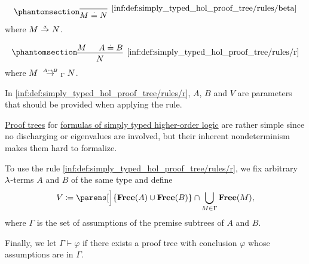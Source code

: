 \begin{definition}
\begin{thmenum}[series=def:simply_typed_hol_proof_tree]
\begin{paracol}{3}
      \begin{nthcolumn}{1}
        \ParacolAlignmentHack
        \begin{equation*}\taglabel[\ensuremath{ \logic{A}_4 }]{inf:def:simply_typed_hol_proof_tree/rules/beta}
          \begin{prooftree}
            \infer0[\ref{inf:def:simply_typed_hol_proof_tree/rules/beta}]{ M \syneq N },
          \end{prooftree}
        \end{equation*}
        where \( M \bred N \).
      \end{nthcolumn}

      \begin{nthcolumn}{2}
        \ParacolAlignmentHack
        \begin{equation*}\taglabel[\ensuremath{ \logic{R} }]{inf:def:simply_typed_hol_proof_tree/rules/r}
          \begin{prooftree}
            \hypo{ M }
            \hypo{ A \syneq B }
            \infer2[\ref{inf:def:simply_typed_hol_proof_tree/rules/r}]{ N },
          \end{prooftree}
        \end{equation*}
        where \( M \redrel{A \mapsto B}_\Gamma N \).
      \end{nthcolumn}
    \end{paracol}

    In \ref{inf:def:simply_typed_hol_proof_tree/rules/r}, \( A \), \( B \) and \( V \) are parameters that should be provided when applying the rule.

     \hyperref[con:proof_tree]{Proof trees} for \hyperref[def:simply_typed_hol_formula]{formulas of simply typed higher-order logic} are rather simple since no discharging or eigenvalues are involved, but their inherent nondeterminism makes them hard to formalize.

    To use the rule \ref{inf:def:simply_typed_hol_proof_tree/rules/r}, we fix arbitrary \( {\mathrm \lambda} \)-terms \( A \) and \( B \) of the same type and define
    \begin{equation*}
      V \coloneqq \parens[\Big]{ \op*{Free}(A) \cup \op*{Free}(B) } \cap \bigcup_{M \in \Gamma} \op*{Free}(M),
    \end{equation*}
    where \( \Gamma \) is the set of assumptions of the premise subtrees of \( A \) and \( B \).

     Finally, we let \( \Gamma \vdash \varphi \) if there exists a proof tree with conclusion \( \varphi \) whose assumptions are in \( \Gamma \).
  \end{thmenum}
\end{definition}
